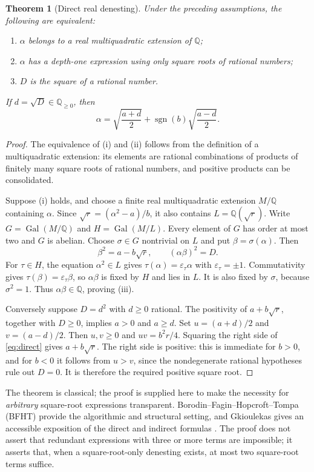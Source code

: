 \documentclass[11pt,oneside]{article}
\numberwithin{equation}{section}
\newtheorem{theorem}{Theorem}[section]
\theoremstyle{definition}
\theoremstyle{remark}
\newcommand{\Q}{\mathbb{Q}}
\newcommand{\Gal}{\operatorname{Gal}}
\newcommand{\sgn}{\operatorname{sgn}}
\begin{document}
\begin{theorem}[Direct real denesting]\label{thm:direct}
Under the preceding assumptions, the following are equivalent:
\begin{enumerate}[label=(\roman*),nosep]
\item $\alpha$ belongs to a real multiquadratic extension of $\Q$;
\item $\alpha$ has a depth-one expression using only square roots of rational numbers;
\item $D$ is the square of a rational number.
\end{enumerate}
If $d=\sqrt D\in\Q_{\ge0}$, then
\begin{equation}\label{eq:direct}
\alpha=\sqrt{\frac{a+d}{2}}+
\sgn(b)\sqrt{\frac{a-d}{2}}.
\end{equation}
\end{theorem}

\begin{proof}
The equivalence of (i) and (ii) follows from the definition of a multiquadratic extension: its elements are rational combinations of products of finitely many square roots of rational numbers, and positive products can be consolidated.

Suppose (i) holds, and choose a finite real multiquadratic extension $M/\Q$ containing $\alpha$. Since $\sqrt r=(\alpha^2-a)/b$, it also contains $L=\Q(\sqrt r)$. Write $G=\Gal(M/\Q)$ and $H=\Gal(M/L)$. Every element of $G$ has order at most two and $G$ is abelian. Choose $\sigma\in G$ nontrivial on $L$ and put $\beta=\sigma(\alpha)$. Then
\[
\beta^2=a-b\sqrt r,
\qquad (\alpha\beta)^2=D.
\]
For $\tau\in H$, the equation $\alpha^2\in L$ gives $\tau(\alpha)=\varepsilon_\tau\alpha$ with $\varepsilon_\tau=\pm1$. Commutativity gives $\tau(\beta)=\varepsilon_\tau\beta$, so $\alpha\beta$ is fixed by $H$ and lies in $L$. It is also fixed by $\sigma$, because $\sigma^2=1$. Thus $\alpha\beta\in\Q$, proving (iii).

Conversely suppose $D=d^2$ with $d\ge0$ rational. The positivity of $a+b\sqrt r$, together with $D\ge0$, implies $a>0$ and $a\ge d$. Set $u=(a+d)/2$ and $v=(a-d)/2$. Then $u,v\ge0$ and $uv=b^2r/4$. Squaring the right side of \eqref{eq:direct} gives $a+b\sqrt r$. The right side is positive: this is immediate for $b>0$, and for $b<0$ it follows from $u>v$, since the nondegenerate rational hypotheses rule out $D=0$. It is therefore the required positive square root.
\end{proof}

The theorem is classical; the proof is supplied here to make the necessity for \emph{arbitrary} square-root expressions transparent. Borodin--Fagin--Hopcroft--Tompa (BFHT) provide the algorithmic and structural setting, and Gkioulekas gives an accessible exposition of the direct and indirect formulas \cite{bfht,gkioulekas}. The proof does not assert that redundant expressions with three or more terms are impossible; it asserts that, when a square-root-only denesting exists, at most two square-root terms suffice.
\end{document}
